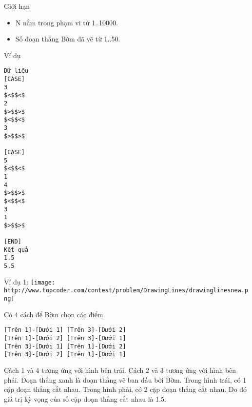 Giới hạn  
\begin{itemize}
	\item     N nằm trong phạm vi từ 1..10000.   
	\item     Số đoạn thẳng Bờm đã vẽ từ 1..50.   
\end{itemize}
   Ví dụ  
\begin{verbatim}
Dữ liệu
[CASE]
3
$<$$<$
2
$>$$>$
$<$$<$
3
$>$$>$

[CASE]
5
$<$$<$
1
4
$>$$>$
$<$$<$
3
1
$>$$>$

[END]
Kết quả
1.5
5.5
\end{verbatim}

   Ví dụ 1:  
\texttt{[image: http://www.topcoder.com/contest/problem/DrawingLines/drawinglinesnew.png]}

   Có 4 cách để Bờm chọn các điểm  
\begin{verbatim}
[Trên 1]-[Dưới 1] [Trên 3]-[Dưới 2]
[Trên 1]-[Dưới 2] [Trên 3]-[Dưới 1]
[Trên 3]-[Dưới 1] [Trên 1]-[Dưới 2]
[Trên 3]-[Dưới 2] [Trên 1]-[Dưới 1]
\end{verbatim}

   Cách 1 và 4 tương ứng với hình bên trái. Cách 2 và 3 tương ứng với hình bên phải. Đoạn thẳng xanh là đoạn thẳng vẽ ban đầu bởi Bờm. Trong hình trái, có 1 cặp đoạn thẳng cắt nhau. Trong hình phải, có 2 cặp đoạn thẳng cắt nhau. Do đó giá trị kỳ vọng của số cặp đoạn thẳng cắt nhau là 1.5.